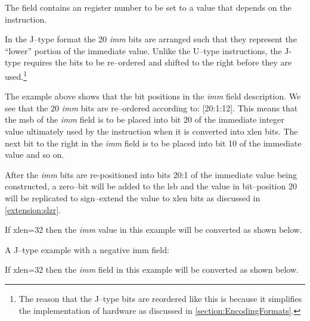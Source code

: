 
The  field contains an  register number to be set to a value that
depends on the instruction.


In the J--type format the 20 {\em imm} bits are arranged such 
that they represent the ``lower'' portion of the immediate value.  Unlike 
the U--type 
instructions, the J-type requires the bits to be re--ordered and shifted 
to the right before they are used.\footnote{The reason that the J--type 
bits are reordered like this is because it simplifies the implementation of 
hardware as discussed in \autoref{section:EncodingFormats}.}

The example above shows that the bit positions in the {\em imm} field 
description.  We see that the 20 {\em imm} bits are re--ordered according to: 
[20:1:12].  
This means that the \acrshort{msb} of the {\em imm} field is to be placed 
into bit 20 of the immediate integer value ultimately used by the instruction 
when it is converted into \Gls{xlen} bits.  
The next bit to the right in the {\em imm} field is to be placed into bit 10 of 
the immediate value and so on.

After the {\em imm} bits are re-positioned into bits 20:1 of the immediate value
being constructed, a zero--bit will be added to the \acrshort{lsb} 
and the value in bit--position 20 will be replicated to sign--extend the 
value to \Gls{xlen} bits as discussed in \autoref{extension:slzr}.

If \Gls{xlen}=32 then the {\em imm} value in this example will be converted as 
shown below.


%

A J--type example with a negative imm field:


If \Gls{xlen}=32 then the {\em imm} field in this example will be converted as 
shown below.



